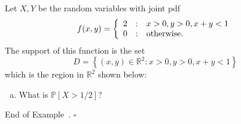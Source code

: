 \documentclass[10pt]{article}
\theoremstyle{definition}
\newtheorem{example}[theorem]{Example}
\renewenvironment{example}
{\begin{oldexample}}
  {\par\smallskip\hfill   End of Example~\theexample. $\square$    \par\end{oldexample}}
\newcommand{\1}[1]{\textbf{1}_{\left[#1\right]}} %
\def\R{\mathbb{R}} %
\def\P{\mathbb{P}} %
\begin{document}
\begin{example}
  Let $X,Y$ be the random variables with joint pdf
  \begin{equation*}
    f(x,y) = \left\{ \begin{array}{l@{\quad:\quad}l} 2 & x>0,y>0, x+y<1\\ 0& \text{otherwise.}\end{array}\right.
  \end{equation*}
  The support of this function is the set
  \begin{equation*}
    D = \left\{(x,y)\in \R^{2}: x>0, y>0, x+y<1\right\} 
  \end{equation*}
  which is the region in $\R^{2}$ shown below:
  \begin{center}
  \end{center}
  \begin{enumerate}[(a)]
    \item What is $\P[X>1/2]$?


\end{enumerate}
\end{example}
\end{document}
